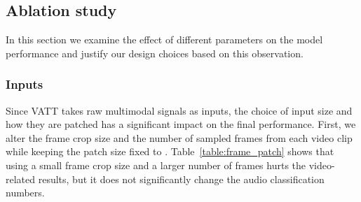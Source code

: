 \documentclass[10pt,twocolumn,letterpaper]{article}
\newcommand{\ours}{VATT\xspace}
\begin{document}
\subsection{Ablation study}
In this section we examine the effect of different parameters on the model performance and justify our design choices based on this observation.

\subsubsection{Inputs}
Since \ours takes raw multimodal signals as inputs, the choice of input size and how they are patched has a significant impact on the final performance. First, we alter the frame crop size and the number of sampled frames from each video clip while keeping the patch size fixed to .  Table~\ref{table:frame_patch} shows that using a small frame crop size and a larger number of frames hurts the video-related results, but it does not significantly change the audio classification numbers.
\end{document}
